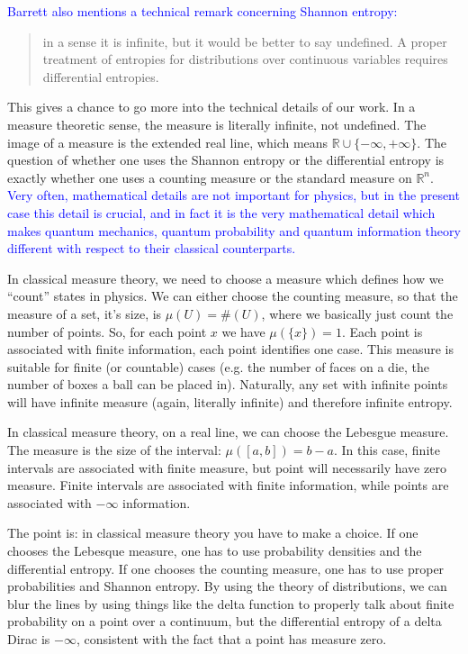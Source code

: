 \documentclass[11pt]{article}
\begin{document}
\textcolor{blue}{Barrett also mentions a technical remark concerning Shannon entropy:}
\begin{quote}
in a sense it is infinite, but it would be better to say undefined. A proper treatment of entropies for distributions over continuous variables requires differential entropies.
\end{quote}

This gives a chance to go more into the technical details of our work. In a measure theoretic sense, the measure is literally infinite, not undefined. The image of a measure is the extended real line, which means $\mathbb{R} \cup \{-\infty, +\infty\}$. The question of whether one uses the Shannon entropy or the differential entropy is exactly whether one uses a counting measure or the standard measure on $\mathbb{R}^n$. \textcolor{blue}{Very often, mathematical details are not important for physics, but in the present case this detail is crucial, and in fact it is the very mathematical detail which makes quantum mechanics, quantum probability and quantum information theory different with respect to their classical counterparts.}

In classical measure theory, we need to choose a measure which defines how we ``count'' states in physics. We can either choose the counting measure, so that the measure of a set, it's size, is $\mu(U) = \#(U)$, where we basically just count the number of points. So, for each point $x$ we have $\mu(\{x\}) = 1$. Each point is associated with finite information, each point identifies one case. This measure is suitable for finite (or countable) cases (e.g. the number of faces on a die, the number of boxes a ball can be placed in). Naturally, any set with infinite points will have infinite measure (again, literally infinite) and therefore infinite entropy.

In classical measure theory, on a real line, we can choose the Lebesgue measure. The measure is the size of the interval: $\mu([a, b]) = b-a$. In this case, finite intervals are associated with finite measure, but point will necessarily have zero measure. Finite intervals are associated with finite information, while points are associated with $-\infty$ information.

The point is: in classical measure theory you have to make a choice. If one chooses the Lebesque measure, one has to use probability densities and the differential entropy. If one chooses the counting measure, one has to use proper probabilities and Shannon entropy. By using the theory of distributions, we can blur the lines by using things like the delta function to properly talk about finite probability on a point over a continuum, but the differential entropy of a delta Dirac is $-\infty$, consistent with the fact that a point has measure zero.
\end{document}
